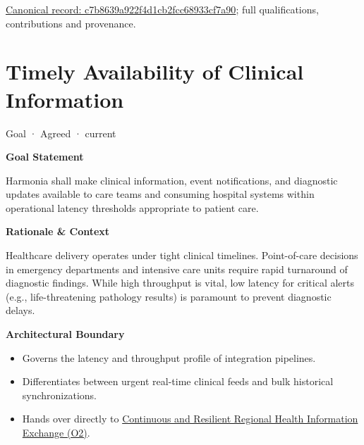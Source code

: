 {\footnotesize \href{../../../../continuum/motivation/goal/c7b8639a922f4d1cb2fcc68933cf7a90.md}{Canonical record: c7b8639a922f4d1cb2fcc68933cf7a90}; full qualifications, contributions and provenance.}\par
\section{Timely Availability of Clinical Information}

\label{element:26e84fb0acfc49f1ac501b64a6e4bbf7}
{\small Goal · Agreed · current}\par

\par\medskip\textbf{Goal Statement}\par


Harmonia shall make clinical information, event notifications, and diagnostic updates available to care teams and consuming hospital systems within operational latency thresholds appropriate to patient care.



\par\medskip\textbf{Rationale \& Context}\par


Healthcare delivery operates under tight clinical timelines. Point-of-care decisions in emergency departments and intensive care units require rapid turnaround of diagnostic findings. While high throughput is vital, low latency for critical alerts (e.g., life-threatening pathology results) is paramount to prevent diagnostic delays.



\par\medskip\textbf{Architectural Boundary}\par


\begin{itemize}


\item Governs the latency and throughput profile of integration pipelines.

\item Differentiates between urgent real-time clinical feeds and bulk historical synchronizations.

\item Hands over directly to \href{\detokenize{../../../../../docs/markdown/01-motivation/goals-outcomes/business-outcomes.md}}{Continuous and Resilient Regional Health Information Exchange (O2)}.

\end{itemize}

